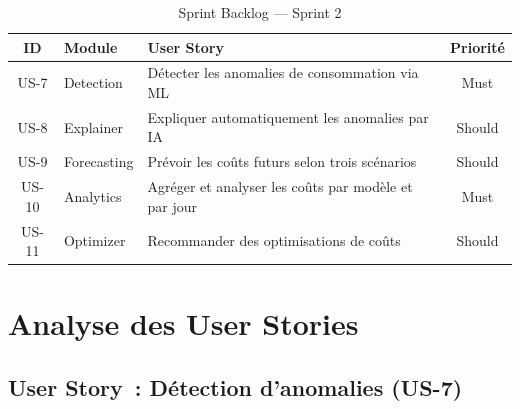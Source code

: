 \begin{table}[H]
\centering
\caption{Sprint Backlog --- Sprint 2}
\label{tab:sprint2_backlog}
\begin{tabularx}{\textwidth}{|c|l|X|c|}
\hline
\textbf{ID} & \textbf{Module} & \textbf{User Story} & \textbf{Priorité} \\
\hline
US-7 & Detection & Détecter les anomalies de consommation via ML & Must \\
\hline
US-8 & Explainer & Expliquer automatiquement les anomalies par IA & Should \\
\hline
US-9 & Forecasting & Prévoir les coûts futurs selon trois scénarios & Should \\
\hline
US-10 & Analytics & Agréger et analyser les coûts par modèle et par jour & Must \\
\hline
US-11 & Optimizer & Recommander des optimisations de coûts & Should \\
\hline
\end{tabularx}
\end{table}


\section{Analyse des User Stories}
\label{sec:s2_stories}

\subsection{User Story~: Détection d'anomalies (US-7)}


